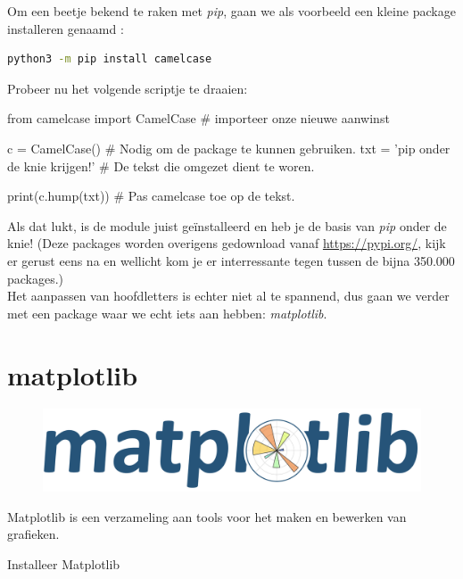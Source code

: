 Om een beetje bekend te raken met \textit{pip}, gaan we als voorbeeld een kleine package installeren genaamd :
\begin{lstlisting}[language=bash]
python3 -m pip install camelcase
\end{lstlisting}

Probeer nu het volgende scriptje te draaien:
\begin{python}
from camelcase import CamelCase     # importeer onze nieuwe aanwinst

c = CamelCase()                     # Nodig om de package te kunnen gebruiken.
txt = 'pip onder de knie krijgen!'  # De tekst die omgezet dient te woren.

print(c.hump(txt))                  # Pas camelcase toe op de tekst.
\end{python}
Als dat lukt, is de module juist geïnstalleerd en heb je de basis van \textit{pip} onder de knie! (Deze packages worden overigens gedownload vanaf \url{https://pypi.org/}, kijk er gerust eens na en wellicht kom je er interressante tegen tussen de bijna 350.000 packages.) \\
Het aanpassen van hoofdletters is echter niet al te spannend, dus gaan we verder met een package waar we echt iets aan hebben: \textit{matplotlib}. 
\section{matplotlib}

\begin{figure}[h!]
\centering\includegraphics[scale=0.25]{Pictures/chapter07/matplotlib_logo.png}
\label{fig:mpllogo} %
\end{figure}

Matplotlib is een verzameling aan tools voor het maken en bewerken van grafieken. 
\begin{exercise}
  Installeer Matplotlib
\end{exercise}

